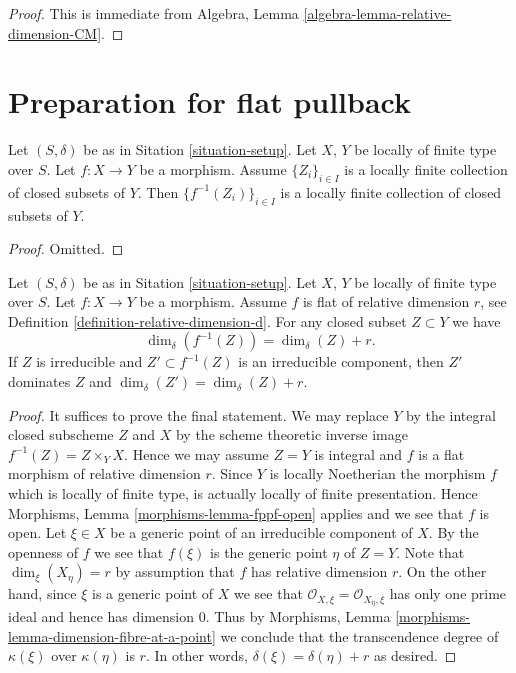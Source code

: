 \begin{proof}
This is immediate from
Algebra,
Lemma
\ref{algebra-lemma-relative-dimension-CM}.
\end{proof}







\section{Preparation for flat pullback}
\label{section-preparation-flat-pullback}


\begin{lemma}
\label{lemma-inverse-image-locally-finite}
Let $(S, \delta)$ be as in Sitation \ref{situation-setup}.
Let $X$, $Y$ be locally of finite type over $S$.
Let $f : X \to Y$ be a morphism.
Assume $\{Z_i\}_{i \in I}$ is a locally
finite collection of closed subsets of $Y$.
Then $\{f^{-1}(Z_i)\}_{i \in I}$ is a locally finite
collection of closed subsets of $Y$.
\end{lemma}

\begin{proof}
Omitted.
\end{proof}

\begin{lemma}
\label{lemma-flat-inverse-image-dimension}
Let $(S, \delta)$ be as in Sitation \ref{situation-setup}.
Let $X$, $Y$ be locally of finite type over $S$.
Let $f : X \to Y$ be a morphism.
Assume $f$ is flat of relative dimension $r$, see
Definition \ref{definition-relative-dimension-d}.
For any closed subset $Z \subset Y$ we have
$$
\dim_\delta(f^{-1}(Z)) = \dim_\delta(Z) + r.
$$
If $Z$ is irreducible and $Z' \subset f^{-1}(Z)$ is an irreducible
component, then $Z'$ dominates $Z$ and
$\dim_\delta(Z') = \dim_\delta(Z) + r$.
\end{lemma}

\begin{proof}
It suffices to prove the final statement.
We may replace $Y$ by the integral closed subscheme $Z$ and
$X$ by the scheme theoretic inverse image $f^{-1}(Z) = Z \times_Y X$.
Hence we may assume $Z = Y$ is integral and $f$ is a flat morphism
of relative dimension $r$. Since $Y$ is locally Noetherian the
morphism $f$ which is locally of finite type,
is actually locally of finite presentation. Hence
Morphisms, Lemma \ref{morphisms-lemma-fppf-open}
applies and we see that $f$ is open.
Let $\xi \in X$ be a generic point of an irreducible component
of $X$. By the openness of $f$ we see that $f(\xi)$ is the
generic point $\eta$ of $Z = Y$. Note that $\dim_\xi(X_\eta) = r$
by assumption that $f$ has relative dimension $r$. On the other
hand, since $\xi$ is a generic point of $X$ we see that
$\mathcal{O}_{X, \xi} = \mathcal{O}_{X_\eta, \xi}$ has only one
prime ideal and hence has dimension $0$. Thus by
Morphisms, Lemma \ref{morphisms-lemma-dimension-fibre-at-a-point}
we conclude that the transcendence
degree of $\kappa(\xi)$ over $\kappa(\eta)$ is $r$.
In other words, $\delta(\xi) = \delta(\eta) + r$ as desired.
\end{proof}




